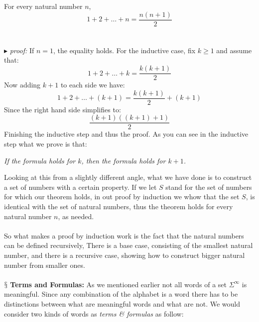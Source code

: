 \documentclass[10pt,a4paper]{article}
\newcounter{theo}
\newcommand{\newpoint}[1]{\indent$\mathsection$ \textbf{#1}}
\newcommand{\proof}{\\ \ \\ $\blacktriangleright$ \textit{proof: }}
\begin{document}
                    \begin{theorem}
                        For every natural number $n$,
                        \begin{equation}
                            1+2+\dots + n = \frac{n(n+1)}{2}
                        \end{equation}
                    \
                    \proof If $n=1$, the equality holds. For the inductive case, fix $k\geq 1$ and assume that:
                    \begin{equation}
                        1+2+\dots+k =\frac{k(k+1)}{2}
                    \end{equation}
                    Now adding $k+1$ to each side we have:
                    \begin{equation}
                        1+2+\dots+(k+1) = \frac{k(k+1)}{2}+(k+1)
                    \end{equation}
                    Since the right hand side simplifies to:
                    \begin{equation}
                        \frac{(k+1)((k+1) + 1)}{2}
                    \end{equation}
                    Finishing the inductive step and thus the proof. As you can see in the inductive step what we prove is that:
                    \begin{qt}
                        \textit{If the formula holds for $k$, then the formula holds for $k+1$.}
                    \end{qt}
                    \end{theorem}
                    Looking at this from a slightly different angle, what we have done is to construct a set of numbers with a certain property. If we let $S$ stand for the set of numbers for which our theorem holds, in out proof by induction we whow that the set $S$, is identical with the set of natural numbers, thus the theorem holds for every natural number $n$, as needed.
                    \\
                    \\
                    So what makes a proof by induction work is the fact that the natural numbers can be defined recursively, There is a base case, consisting of the smallest natural number, and there is a recursive case, showing how to construct bigger natural number from smaller ones.
                    \\
                    \\
                    \newpoint{Terms and Formulas:} As we mentioned earlier not all words of a set $\Sigma^\infty$ is meaningful. Since any combination of the alphabet is a word there has to be distinctions between what are meaningful words and what are not. We would consider two kinds of words as \textit{terms \& formulas} as follow:
\end{document}

